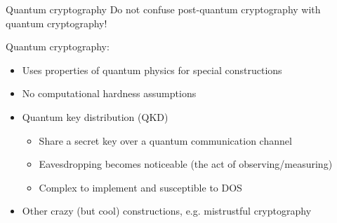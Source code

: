 \begin{frame}{Quantum cryptography}
  Do not confuse post-quantum cryptography with quantum cryptography!

  \vspace*{1em}

  \pause
  Quantum cryptography:
  \begin{itemize}[<+(1)->]
    \item Uses properties of quantum physics for special constructions
    \item No computational hardness assumptions
    \item Quantum key distribution (QKD)
    \begin{itemize}
      \item Share a secret key over a quantum communication channel
      \item Eavesdropping becomes noticeable (the act of observing/measuring)
      \item Complex to implement and susceptible to DOS
    \end{itemize}
    \item Other crazy (but cool) constructions, e.g. mistrustful cryptography
  \end{itemize}
\end{frame}


